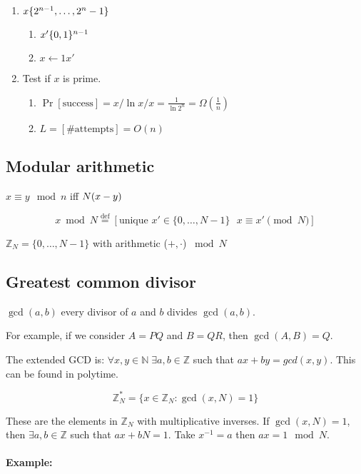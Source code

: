 \documentclass{idc_msc}
\let\getsrandom\relax
\newcommand{\getsrandom}{\ensuremath{\overset{R}{\gets}}}
\let\divides\relax
\newcommand{\divides}[1]{{}^{#1}\vert}
\begin{document}
\begin{enumerate}
  \item \(x \getsrandom \{2^{n-1}, \ldots, 2^n -1\}\)
  \begin{enumerate}
    \item \(x' \getsrandom \{0, 1\}^{n-1}\)
    \item \(x \gets 1x'\)
  \end{enumerate}
  \item Test if \(x\) is prime.
  \begin{enumerate}
    \item \(\Pr[\text{success}] = x / \ln x / x = \frac{1}{\ln 2^n} = \Omega(\frac{1}{n})\)
    \item \(L = [\text{\# attempts}] = O(n)\)
  \end{enumerate}
\end{enumerate}

\subsection{Modular arithmetic}

\(x \equiv y \mod n\) iff \(\divides{N}(x - y)\)

\[
  x \bmod N \overset{\text{def}}{=} [\text{unique \(x' \in \{0, \ldots, N-1\}\) \(x \equiv x' \pmod N\)}]
\]

\(\mathbb{Z}_N = \{0, \ldots, N-1\}\) with arithmetic (\(+, \cdot\)) \(\bmod N\)

\subsection{Greatest common divisor}

\(\gcd(a, b)\) every divisor of \(a\) and \(b\) divides \(\gcd(a,b)\).

For example, if we consider \(A = PQ\) and \(B=QR\), then \(\gcd(A, B) = Q\).

The extended GCD is: \(\forall x, y \in \mathbb{N}\; \exists a, b \in \mathbb{Z}\) such that \(ax+ by = gcd(x, y)\).
This can be found in polytime.

\[
  \mathbb{Z}_N^* = \{x \in \mathbb{Z}_N : \gcd(x, N) = 1 \}
\]

These are the elements in \(\mathbb{Z}_N\) with multiplicative inverses.
If \(\gcd(x, N) = 1\), then \(\exists a, b \in \mathbb{Z}\) such that \(ax + bN = 1\).
Take \(x^{-1} = a\) then \(ax = 1 \mod N\).

\paragraph{Example:}
\end{document}
